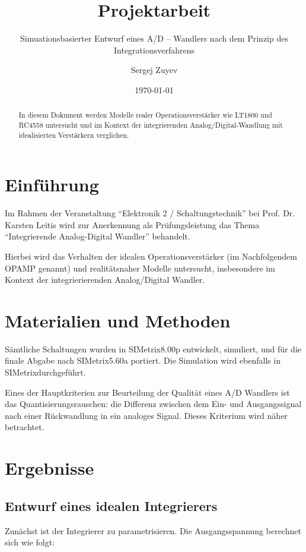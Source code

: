 \documentclass[
	ngerman,
	parskip=half,
	twocolumn,
	DIV=calc,
	]{scrartcl}
\author{Sergej Zuyev}
\title{Projektarbeit}
\subtitle{Simuationsbasierter Entwurf eines A/D – Wandlers nach dem Prinzip des Integrationsverfahrens}
\date{\today}
\begin{document}
	
	\maketitle
	

	\clearpage
	
	\begin{abstract}		
	In diesem Dokument werden Modelle realer Operationsverstärker wie LT1800 und RC4558 untersucht und im Kontext der integrierenden Analog/Digital-Wandlung mit idealisierten Verstärkern verglichen.
	\end{abstract}
	
	\section{Einführung}	
	
		Im Rahmen der Veranstaltung \enquote{Elektronik 2 / Schaltungstechnik} bei Prof. Dr. Karsten Leitis wird zur Anerkennung als Prüfungsleistung das Thema \enquote{Integrierende Analog-Digital Wandler} behandelt.
		
		Hierbei wird das Verhalten der idealen Operationsverstärker (im Nachfolgendem OPAMP genannt) und realitätsnaher Modelle untersucht, insbesondere im Kontext der integrierierenden Analog/Digital Wandler.
	
	\section{Materialien und Methoden}
		
		Sämtliche Schaltungen wurden in SIMetrix\texttrademark 8.00p entwickelt,  simuliert, und für die finale Abgabe nach SIMetrix\texttrademark 5.60a portiert.
		Die Simulation wird ebenfalls in SIMetrix\texttrademark durchgeführt. 
		
		Eines der Hauptkriterien zur Beurteilung der Qualität eines A/D Wandlers ist das Quantisierungsrauschen: die Differenz zwischen dem Ein- und Ausgangssignal nach einer Rückwandlung in ein analoges Signal. 
		Dieses Kriterium wird näher betrachtet. 
		 
	\section{Ergebnisse}
		\subsection{Entwurf eines idealen Integrierers}
		\label{sec:ideal_integrator}
		Zunächst ist der Integrierer zu parametrisieren.		
		Die Ausgangsspannung berechnet sich wie folgt:
		
\end{document}

